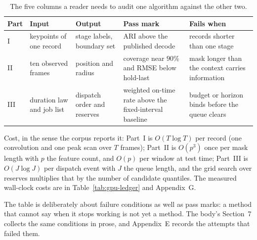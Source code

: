 \begin{table}[htbp]
\centering
\caption{The five columns a reader needs to audit one algorithm against the other two.}
\label{tab:algo-contract}
\small
\begin{tabular}{p{}p{}p{}p{}p{}}
\toprule
Part & Input & Output & Pass mark & Fails when \\
\midrule
I & keypoints of one record & stage labels, boundary set & ARI above the published decode & records shorter than one stage \\
II & ten observed frames & position and radius & coverage near $90\%$ and RMSE below hold-last & mask longer than the context carries information \\
III & duration law and job list & dispatch order and reserves & weighted on-time rate above the fixed-interval baseline & budget or horizon binds before the queue clears \\
\bottomrule
\end{tabular}
\end{table}
Cost, in the sense the corpus reports it: Part~I is $O(T\log T)$ per record (one convolution
and one peak scan over $T$ frames); Part~II is $O(p^{3})$ once per mask length with $p$ the
feature count, and $O(p)$ per window at test time; Part~III is $O(J\log J)$ per dispatch event
with $J$ the queue length, and the grid search over reserves multiplies that by the number of
candidate quantiles. The measured wall-clock costs are in Table~\ref{tab:gpu-ledger} and
Appendix~G.

The table is deliberately about failure conditions as well as pass marks: a method that cannot
say when it stops working is not yet a method. The body's Section~7 collects the same
conditions in prose, and Appendix~E records the attempts that failed them.
